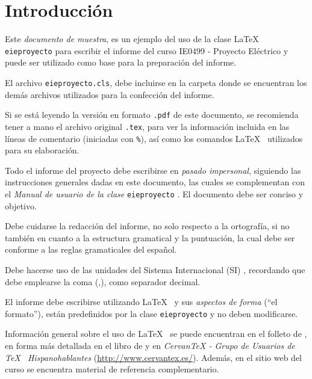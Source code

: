 
\chapter{Introducción}
Este \emph{documento de muestra}, es un ejemplo del uso de la clase \LaTeX~ \texttt{eieproyecto} para escribir el informe del curso IE0499 - Proyecto Eléctrico y puede ser utilizado como base para la preparación del informe.

El archivo \texttt{eieproyecto.cls}, debe incluirse en la carpeta donde se encuentran los demás archivos utilizados para la confección del informe.

Si se está leyendo la versión en formato \texttt{.pdf} de este documento, se recomienda tener a mano el archivo original \texttt{.tex}, para ver la información incluida en las líneas de comentario (iniciadas con \texttt{\%}), así como los comandos \LaTeX~ utilizados para su elaboración.

Todo el informe del proyecto debe escribirse en \emph{pasado impersonal}, siguiendo las instrucciones generales dadas en este documento, las cuales se complementan con el \emph{Manual de usuario de la clase} \texttt{eieproyecto} \citep{vmaeieproyman}.  El documento debe ser conciso y objetivo. 

Debe cuidarse la redacción del informe, no solo respecto a la ortografía, si no también en cuanto a la estructura gramatical y la puntuación, la cual debe ser conforme a las reglas gramaticales del español.

Debe hacerse uso de las unidades del Sistema Internacional (SI) \citep{RTCR443-2010}, recordando que debe emplearse la coma (,), como separador decimal.

El informe debe escribirse utilizando \LaTeX~ y sus \emph{aspectos de forma} (``el formato''), están predefinidos por la clase \texttt{eieproyecto} y no deben modificarse.

Información general sobre el uso de \LaTeX~ se puede encuentran en el folleto de \cite{nsces}, en forma más detallada en el libro de \cite{latexcomp} y en \emph{CervanTeX - Grupo de Usuarios de \TeX~ Hispanohablantes} (\url{http://www.cervantex.es/}).  Además, en el sitio web del curso se encuentra material de referencia complementario.

